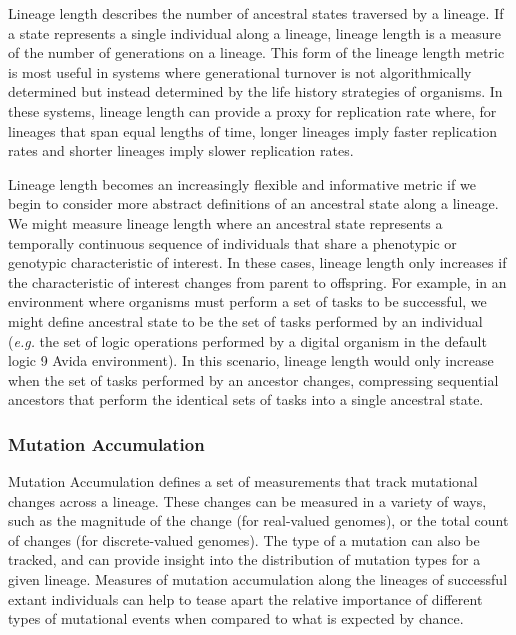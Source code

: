 \documentclass[letterpaper]{article}
\begin{document}
Lineage length describes the number of ancestral states traversed by a lineage. If a state represents a single individual along a lineage, lineage length is a measure of the number of generations on a lineage. This form of the lineage length metric is most useful in systems where generational turnover is not algorithmically determined but instead determined by the life history strategies of organisms. In these systems, lineage length can provide a proxy for replication rate where, for lineages that span equal lengths of time, longer lineages imply faster replication rates and shorter lineages imply slower replication rates. 

Lineage length becomes an increasingly flexible and informative metric if we begin to consider more abstract definitions of an ancestral state along a lineage. 
We might measure lineage length where an ancestral state represents a temporally continuous sequence of individuals that share a phenotypic or genotypic characteristic of interest. In these cases, lineage length only increases if the characteristic of interest changes from parent to offspring. For example, in an environment where organisms must perform a set of tasks to be successful, we might define ancestral state to be the set of tasks performed by an individual (\textit{e.g.} the set of logic operations performed by a digital organism in the default logic 9 Avida environment). In this scenario, lineage length would only increase when the set of tasks performed by an ancestor changes, compressing sequential ancestors that perform the identical sets of tasks into a single ancestral state. 

\subsubsection{Mutation Accumulation}
Mutation Accumulation defines a set of measurements that track mutational changes across a lineage. These changes can be measured in a variety of ways, such as the magnitude of the change (for real-valued genomes), or the total count of changes (for discrete-valued genomes). The type of a mutation can also be tracked, and can provide insight into the distribution of mutation types for a given lineage. Measures of mutation accumulation along the lineages of successful extant individuals can help to tease apart the relative importance of different types of mutational events when compared to what is expected by chance. 
\end{document}
